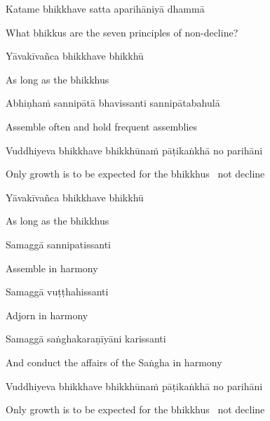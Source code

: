 \begin{leader}
\end{leader}

Katame bhikkhave satta aparihāniyā dhammā

\begin{english}
  What bhikkus are the seven principles of non-decline?
\end{english}

Yāvakīvañca bhikkhave bhikkhū

\begin{english}
  As long as the bhikkhus
\end{english}

Abhiṇhaṁ sannipātā bhavissanti sannipātabahulā

\begin{english}
  Assemble often and hold frequent assemblies
\end{english}

Vuddhiyeva bhikkhave bhikkhūnaṁ pāṭikaṅkhā no parihāni

\begin{english}
  Only growth is to be expected for the bhikkhus \breathmark\ not decline
\end{english}

Yāvakīvañca bhikkhave bhikkhū

\begin{english}
  As long as the bhikkhus
\end{english}

Samaggā sannipatissanti

\begin{english}
  Assemble in harmony
\end{english}

Samaggā vuṭṭhahissanti

\begin{english}
  Adjorn in harmony
\end{english}

Samaggā saṅghakaraṇīyāni karissanti

\begin{english}
  And conduct the affairs of the Saṅgha in harmony
\end{english}

Vuddhiyeva bhikkhave bhikkhūnaṁ pāṭikaṅkhā no parihāni

\begin{english}
  Only growth is to be expected for the bhikkhus \breathmark\ not decline
\end{english}

